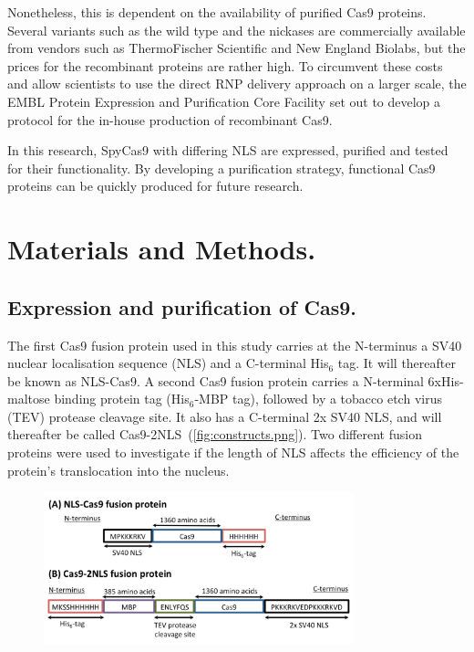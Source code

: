 \documentclass[11pt]{article}
\begin{document}
Nonetheless, this is dependent on the availability of purified Cas9 proteins. Several variants such as the wild type and the nickases are commercially available from vendors such as ThermoFischer Scientific and New England Biolabs, but the prices for the recombinant proteins are rather high. To circumvent these costs and allow scientists to use the direct RNP delivery approach on a larger scale, the EMBL Protein Expression and Purification Core Facility set out to develop a protocol for the in-house production of recombinant Cas9.

In this research, SpyCas9 with differing NLS are expressed, purified and tested for their functionality. By developing a purification strategy, functional Cas9 proteins can be quickly produced for future research. 

\section{Materials and Methods.}\label{sec:methods}

\subsection{Expression and purification of Cas9.}

The first Cas9 fusion protein used in this study carries at the N-terminus a SV40 nuclear localisation sequence (NLS) and a C-terminal His$_{6}$ tag. It will thereafter be known as NLS-Cas9. A second Cas9 fusion protein carries a N-terminal 6xHis-maltose binding protein tag (His$_{6}$-MBP tag), followed by a tobacco etch virus (TEV) protease cleavage site. It also has a C-terminal 2x SV40 NLS, and will thereafter be called Cas9-2NLS~(\autoref{fig:constructs.png}). Two different fusion proteins were used to investigate if the length of NLS affects the efficiency of the protein's translocation into the nucleus.

\begin{figure}[H]
  \centering
    \includegraphics[width=0.8\textwidth]{constructs.png}
    \label{fig:constructs.png}
\end{figure}
\end{document}
